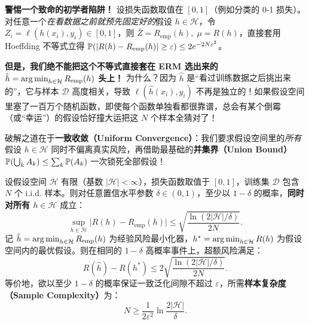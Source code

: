 \textbf{警惕一个致命的初学者陷阱！} 设损失函数取值在 $[0, 1]$（例如分类的 0-1 损失）。对任意一个\emph{在看数据之前就预先固定好的}假设 $h \in \mathcal{H}$，令 $Z_i = \ell(h(x_i), y_i) \in [0, 1]$，则 $\bar{Z} = R_{\mathrm{emp}}(h),\; \mu = R(h)$，直接套用 Hoeffding 不等式立得 $\mathbb{P}(|R(h) - R_{\mathrm{emp}}(h)| \ge \varepsilon) \le 2e^{-2N\varepsilon^2}$。

\textbf{但是，我们绝不能把这个不等式直接套在 ERM 选出来的 $\hat{h} = \operatorname*{arg\,min}_{h\in\mathcal{H}} R_{\mathrm{emp}}(h)$ 头上！} 为什么？因为 $\hat{h}$ 是“看过训练数据之后挑出来的”，它与样本 $\mathcal{D}$ 高度相关，导致 $\ell(\hat{h}(x_i), y_i)$ 不再是独立的！如果假设空间里塞了一百万个随机函数，即使每个函数单独看都很靠谱，总会有某个倒霉（或“幸运”）的假设恰好撞大运把这 $N$ 个样本全猜对了！

破解之道在于\textbf{一致收敛（Uniform Convergence）}：我们要求假设空间里的\emph{所有}假设 $h \in \mathcal{H}$ 同时不偏离真实风险，再借助最基础的\textbf{并集界（Union Bound）} $\mathbb{P}(\bigcup_k A_k) \le \sum_k \mathbb{P}(A_k)$ 一次锁死全部假设！

\begin{thmBox}
\begin{theorem}\label{thm:v4-pac-finite}
设假设空间 $\mathcal{H}$ 有限（基数 $|\mathcal{H}| < \infty$），损失函数取值于 $[0, 1]$，训练集 $\mathcal{D}$ 包含 $N$ 个 i.i.d. 样本。则对任意置信水平参数 $\delta \in (0, 1)$，至少以 $1 - \delta$ 的概率，\textbf{同时对所有 $h \in \mathcal{H}$} 成立：
\begin{equation}\label{eq:v4-pac-bound}
  \sup_{h \in \mathcal{H}} \big|R(h) - R_{\mathrm{emp}}(h)\big| \le \sqrt{\frac{\ln(2|\mathcal{H}| / \delta)}{2N}}.
\end{equation}
记 $\hat{h} = \operatorname*{arg\,min}_{h\in\mathcal{H}} R_{\mathrm{emp}}(h)$ 为经验风险最小化器，$h^* = \operatorname*{arg\,min}_{h\in\mathcal{H}} R(h)$ 为假设空间内的最优假设。则在相同的 $1-\delta$ 高概率事件上，超额风险满足：
\begin{equation}\label{eq:v4-erm-excess}
  R(\hat{h}) - R(h^*) \le 2\sqrt{\frac{\ln(2|\mathcal{H}| / \delta)}{2N}}.
\end{equation}
等价地，欲以至少 $1-\delta$ 的概率保证一致泛化间隙不超过 $\varepsilon$，所需\textbf{样本复杂度（Sample Complexity）}为：
\begin{equation}\label{eq:v4-sample-comp}
  N \ge \frac{1}{2\varepsilon^2}\ln\frac{2|\mathcal{H}|}{\delta}.
\end{equation}
\end{theorem}
\end{thmBox}


